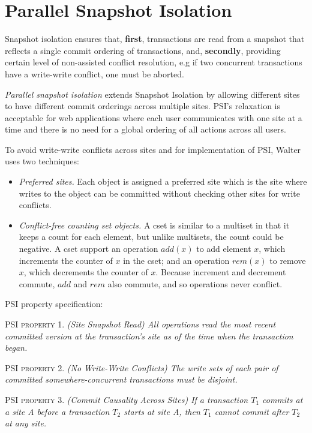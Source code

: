\documentclass[a4paper]{article}
\begin{document}
\section{Parallel Snapshot Isolation}
Snapshot isolation ensures that, \textbf{first}, transactions are read from a snapshot that reflects a single commit ordering of transactions, and, \textbf{secondly}, providing certain level of non-assisted conflict resolution, e.g if two concurrent transactions have a write-write conflict, one must be aborted.
 
\textit{Parallel snapshot isolation} extends Snapshot Isolation by allowing different sites to have different commit orderings across multiple sites. PSI's relaxation is acceptable for web applications where each user communicates with one site at a time and there is no need for a global ordering of all actions across all users. 

To avoid write-write conflicts across sites and for implementation of PSI, Walter uses two techniques:
\begin{itemize}
\item \textit{Preferred sites.} Each object is assigned a preferred site which is the site where writes to the object can be committed without checking other sites for write conflicts.
\item \textit{Conflict-free counting set objects.} A cset is similar to a multiset in that it keeps a count for each element, but unlike multisets, the count could be negative. A cset support an operation $add(x)$ to add element $x$, which increments the counter of $x$ in the cset; and an operation $rem(x)$ to remove $x$, which decrements the counter of $x$. Because increment and decrement commute, $add$ and $rem$ also commute, and so operations never conflict. 
\end{itemize}

PSI property specification:

PSI \textsc{property} 1. \textit{(Site Snapshot Read) All operations read the most recent committed version at the transaction's site as of the time when the transaction began.}

PSI \textsc{property} 2. \textit{(No Write-Write Conflicts) The write sets of each pair of committed somewhere-concurrent transactions must be disjoint.}

PSI \textsc{property} 3. \textit{(Commit Causality Across Sites) If a transaction $T_{1}$ commits at a site A before a transaction $T_{2}$ starts at site A, then $T_{1}$ cannot commit after $T_{2}$ at any site.}
\end{document}
